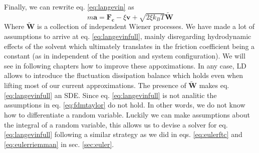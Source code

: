 \documentclass[ twoside,openright,titlepage,numbers=noenddot,%
headinclude,footinclude,cleardoublepage=empty,abstract=on,
BCOR=5mm,paper=a4,fontsize=11pt, dvipsnames
]{scrreprt}
\renewcommand{\vec}[1]{\bm{#1}}
\begin{document}
Finally, we can rewrite eq. \eqref{eq:langevin} as
%
%
\begin{equation}
  \label{eq:langevinfull}
  m\vec{a} = \vec{F_c} - \xi \vec{v} + \sqrt{2\xi k_BT}\vec{\widetilde{W}}
\end{equation}
Where $\vec{\widetilde{W}}$ is a collection of independent Wiener processes.
We have made a lot of assumptions to arrive at eq. \eqref{eq:langevinfull}, mainly disregarding hydrodynamic effects of the solvent which ultimately translates in the friction coefficient being a constant (as in independent of the position and system configuration). We will see in following chapters how to improve these appoximations. In any case, \gls{LD} allows to introduce the fluctuation dissipation balance which holds even when lifting most of our current approximations.
The presence of $\vec{\widetilde{W}}$ makes eq. \eqref{eq:langevinfull} an \gls{SDE}. Since eq. \eqref{eq:langevinfull} is not analitic the assumptions in eq. \eqref{eq:fdmtaylor} do not hold. In other words, we do not know how to differentiate a random variable. Luckily we can make assumptions about the integral of a random variable, this allows us to devise a solver for eq. \eqref{eq:langevinfull} following a similar strategy as we did in eqs. \eqref{eq:eulerftc} and \eqref{eq:eulerriemman} in sec. \ref{sec:euler}.
\end{document}
